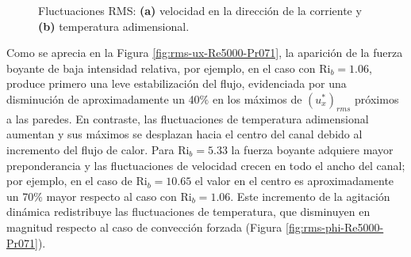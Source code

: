 \begin{figure}[H]
  \centering
  
    \caption{Fluctuaciones RMS: \textbf{(a)} velocidad en la dirección de la corriente y \textbf{(b)} temperatura adimensional.}
    \label{fig:rms-Re5000-Pr071}
\end{figure}

Como se aprecia en la Figura \ref{fig:rms-ux-Re5000-Pr071}, la aparición de la fuerza boyante de baja intensidad relativa, por ejemplo, en el caso con $\text{Ri}_b=1\text{.}06$, produce primero una leve estabilización del flujo, evidenciada por una disminución de aproximadamente un 40$\%$ en los máximos de $(u^*_x)_{rms}$ próximos a las paredes. En contraste, las fluctuaciones de temperatura adimensional aumentan y sus máximos se desplazan hacia el centro del canal debido al incremento del flujo de calor. Para $\text{Ri}_b=5\text{.}33$ la fuerza boyante adquiere mayor preponderancia y las fluctuaciones de velocidad crecen en todo el ancho del canal; por ejemplo, en el caso de $\text{Ri}_b=10\text{.}65$ el valor en el centro es aproximadamente un 70$\%$ mayor respecto al caso con $\text{Ri}_b=1\text{.}06$. Este incremento de la agitación dinámica redistribuye las fluctuaciones de temperatura, que disminuyen en magnitud respecto al caso de convección forzada (Figura \ref{fig:rms-phi-Re5000-Pr071}).


